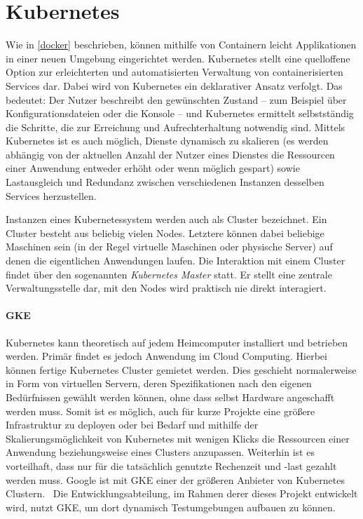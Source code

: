 \section{Kubernetes}
Wie in \ref{docker} beschrieben, können mithilfe von Containern leicht Applikationen in einer neuen Umgebung eingerichtet werden.
Kubernetes stellt eine quelloffene Option zur erleichterten und automatisierten Verwaltung von containerisierten Services dar.
Dabei wird von Kubernetes ein deklarativer Ansatz verfolgt.
Das bedeutet: Der Nutzer beschreibt den gewünschten Zustand -- zum Beispiel über Konfigurationsdateien oder die Konsole -- und Kubernetes ermittelt selbstständig die Schritte, die zur Erreichung und Aufrechterhaltung notwendig sind.
Mittels Kubernetes ist es auch möglich, Dienste dynamisch zu skalieren (\dash es werden abhängig von der aktuellen Anzahl der Nutzer eines Dienstes die Ressourcen einer Anwendung entweder erhöht oder wenn möglich gespart) sowie Lastausgleich und Redundanz zwischen verschiedenen Instanzen desselben Services herzustellen.~\cite{Bloß2019, wasistk8s}

Instanzen eines Kubernetessystem werden auch als Cluster bezeichnet.
Ein Cluster besteht aus beliebig vielen Nodes.
Letztere können dabei beliebige Maschinen sein (in der Regel virtuelle Maschinen oder physische Server) auf denen die eigentlichen Anwendungen laufen.
Die Interaktion mit einem Cluster findet über den sogenannten \emph{Kubernetes Master} statt.
Er stellt eine zentrale Verwaltungsstelle dar, mit den Nodes wird praktisch nie direkt interagiert.~\cite{k8skonzepte}

\paragraph{\ac{GKE}}
Kubernetes kann theoretisch auf jedem Heimcomputer installiert und betrieben werden.
Primär findet es jedoch Anwendung im Cloud Computing.
Hierbei können fertige Kubernetes Cluster gemietet werden.
Dies geschieht normalerweise in Form von virtuellen Servern, deren Spezifikationen nach den eigenen Bedürfnissen gewählt werden können, ohne dass selbst Hardware angeschafft werden muss.
Somit ist es möglich, auch für kurze Projekte eine größere Infrastruktur zu deployen oder bei Bedarf und mithilfe der Skalierungsmöglichkeit von Kubernetes mit wenigen Klicks die Ressourcen einer Anwendung beziehungsweise eines Clusters anzupassen.
Weiterhin ist es vorteilhaft, dass nur für die tatsächlich genutzte Rechenzeit und -last gezahlt werden muss.
Google ist mit \ac{GKE} einer der größeren Anbieter von Kubernetes Clustern.~\cite{gke}
Die Entwicklungsabteilung, im Rahmen derer dieses Projekt entwickelt wird, nutzt \ac{GKE}, um dort dynamisch Testumgebungen aufbauen zu können.

